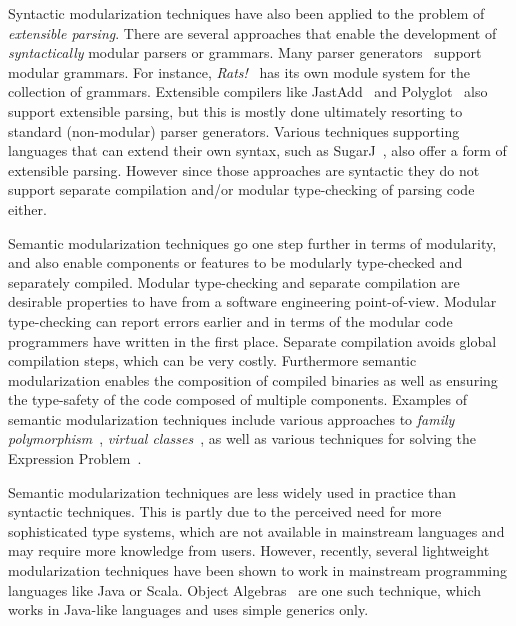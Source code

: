 Syntactic modularization techniques have also been applied to the
problem of \emph{extensible parsing}. There are several approaches
that enable the development of \emph{syntactically} modular parsers or
grammars. Many parser
generators~\cite{antlr1995,Grimm2006,Gouseti2014,Warth2016} support
modular grammars. For instance, \textit{Rats!}~\cite{Grimm2006} has
its own module system for the collection of grammars.  Extensible
compilers like JastAdd~\cite{Ekman2007} and
Polyglot~\cite{Nystrom2003} also support extensible parsing, but this
is mostly done ultimately resorting to standard (non-modular) parser
generators. Various techniques supporting languages that can extend
their own syntax, such as SugarJ~\cite{Erdweg2011}, also offer a form
of extensible parsing. However since those approaches are syntactic
they do not support separate compilation and/or modular type-checking
of parsing code either.

Semantic modularization techniques go one step further in terms of modularity,
and also enable components or features to be modularly type-checked
and separately compiled. Modular type-checking and separate
compilation are desirable properties to have from a software
engineering point-of-view. Modular type-checking can report errors 
earlier and in terms of the modular code programmers have written 
in the first place. Separate compilation avoids global compilation
steps, which can be very costly. Furthermore semantic modularization 
enables the composition of compiled binaries as well as ensuring the 
type-safety of the code composed of multiple components. Examples of semantic modularization techniques 
include various approaches to \emph{family polymorphism}~\cite{ernst01FP},
\emph{virtual classes}~\cite{Ernst:2006}, as 
well as various techniques for solving the Expression
Problem~\cite{Oliveira:2012}. 

Semantic modularization techniques are less widely used in practice
than syntactic techniques. This is partly due to the perceived need for more
sophisticated type systems, which are not available in mainstream
languages and may require more knowledge from users. However, recently,
several lightweight modularization techniques have been shown to work
in mainstream programming languages like Java or Scala. Object
Algebras~\cite{Oliveira:2012} are one such technique, which works in
Java-like languages and uses simple generics only. 

